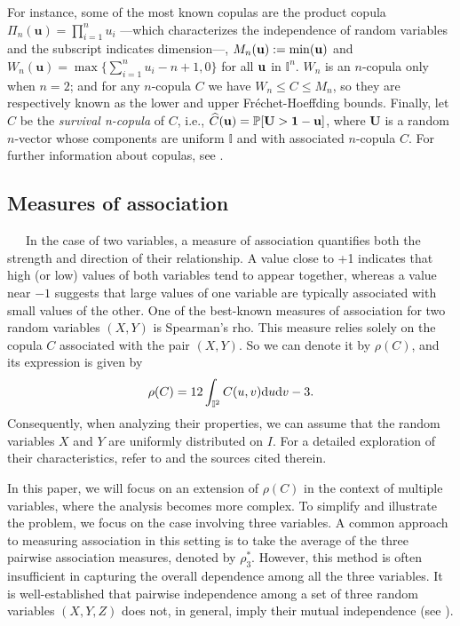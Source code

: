 \documentclass[11pt,a4paper]{article}
\newcommand{\I}{\mbox{${\rm I\!I}$}}
\def\uu{{\mathbf u}}
\def\I{{\mathbb I}}
\begin{document}
For instance, some of the most known copulas are the product copula $\Pi_n( \uu)=\prod_{i=1}^nu_i$ ---which characterizes the independence of random variables and the subscript indicates dimension---, $M_n(\uu):=\min({\bf u})$ and $W_n(\uu)=\max\{\sum_{i=1}^nu_i-n+1,0\}$ for all ${\bf u}$ in $\I^n$. $W_n$ is an $n$-copula only when $n=2$; and for any $n$-copula $C$ we have $W_n\le C\le M_n$, so they are respectively known as the lower and upper Fr\'echet-Hoeffding bounds. Finally, let $\widehat{C}$ be the {\it survival n-copula} of $C$, i.e., $\widehat{C}({\bf u})=\mathbb{P}[{\bf U}>{\bf 1-u}]$, where {\bf U} is a random $n$-vector whose components are uniform $\I$ and with associated $n$-copula $C$. For further information about copulas, see \cite{Durante2016book,Ne06}.  


\subsection{Measures of association}

$\phantom{999}$In the case of two variables, a measure of association quantifies both the strength and direction of their relationship. A value close to +1 indicates that high (or low) values of both variables tend to appear together, whereas a value near $-1$ suggests that large values of one variable are typically associated with small values of the other. One of the best-known measures of association for two random variables $(X,Y)$ is Spearman's rho. This measure relies solely on the copula $C$ associated with the pair $(X,Y)$. So we can denote it by $\rho(C)$, and its expression is given by 
$$\rho(C)=12\int_{\I^2}C(u,v){\rm d}u{\rm d}v-3.$$
Consequently, when analyzing their properties, we can assume that the random variables $X$ and $Y$ are uniformly distributed on $I$. For a detailed exploration of their characteristics, refer to \cite{Ne06} and the sources cited therein.

In this paper, we will focus on an extension of $\rho(C)$ in the context of multiple variables, where the analysis becomes more complex. To simplify and illustrate the problem, we focus on the case involving three variables. A common approach to measuring association in this setting is to take the average of the three pairwise association measures, denoted by $\rho_3^*$. However, this method is often insufficient in capturing the overall dependence among all the three variables. It is well-established that pairwise independence among a set of three random variables $(X,Y,Z)$ does not, in general, imply their mutual independence (see \cite[Example 1]{Ne2011}).
\end{document}
